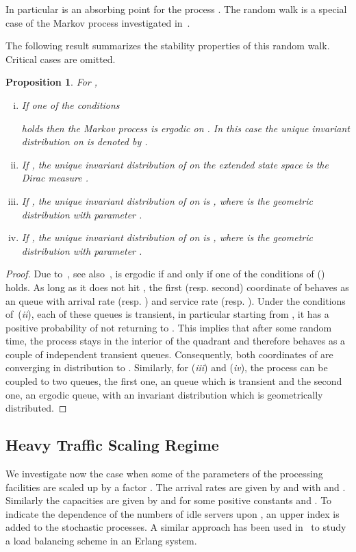 \documentclass{amsart}
\newtheorem{proposition}{Proposition}
\begin{document}
In particular  is an absorbing point for the process . 
The random walk  is a special case of the Markov process investigated in~\cite{FayolleIas}. 

The following result summarizes the stability properties of this random walk. Critical cases are omitted. 
\begin{proposition}\label{P1}
For ,
\begin{enumerate}[(i)]
\item If one of the conditions 

holds then the Markov process  is ergodic on . In this case the unique invariant distribution on  is denoted by . 

\item If ,
the unique invariant distribution of  on the extended state space  is the Dirac measure .
\item If , the unique invariant distribution of  on  is , where  is the geometric distribution with parameter . 
\item If , the unique invariant distribution of  on  is , where  is the geometric distribution with parameter .
\end{enumerate}
\end{proposition}

\begin{proof}
Due to~\cite{FayolleIas}, see also~\cite[Proposition~9.15]{Robert},  is ergodic if and only if one of the conditions of ()  holds. {As long as it does not hit , the first (resp. second)  coordinate of  behaves as an  queue with arrival rate  (resp. )  and service rate  (resp.  ). Under the conditions of~({\em ii}), each of these   queues is transient, in particular starting from , it has a positive probability of not returning to . This implies that after some random time, the process  stays in the interior of the quadrant  and therefore  behaves as a couple of independent transient  queues. Consequently, both coordinates of  are converging in distribution to .} Similarly, for ({\em iii}) and ({\em iv}), the process  can be coupled to two queues, the first one, an  queue which is transient and the second one, an ergodic  queue, with an invariant distribution which is geometrically distributed. 
\end{proof}

\subsection{Heavy Traffic Scaling Regime}
We investigate now the case when some of the parameters of the processing facilities are scaled up by a factor . The arrival rates are given by  and  with  and . Similarly the capacities are given by  and  for some positive constants  and . To indicate the dependence of the numbers of idle servers upon , an upper index  is added to the stochastic processes. A similar approach has been used in~\cite{Hajek} to study a load balancing scheme in an Erlang system. 
\end{document}
